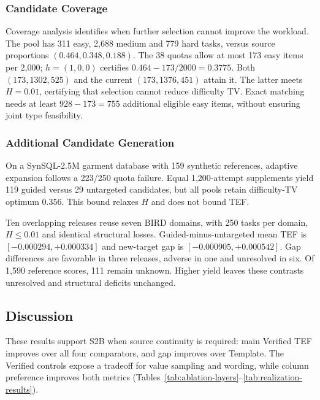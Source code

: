 \subsubsection{Candidate Coverage}\label{sec:current-support}

Coverage analysis identifies when further selection cannot improve the workload. The pool has 311 easy, 2,688 medium and 779 hard tasks, versus source proportions $(0.464,0.348,0.188)$. The 38 quotas allow at most 173 easy items per 2,000; $h=(1,0,0)$ certifies $0.464-173/2000=0.3775$. Both $(173,1302,525)$ and the current $(173,1376,451)$ attain it. The latter meets $H=0.01$, certifying that selection cannot reduce difficulty TV. Exact matching needs at least $928-173=755$ additional eligible easy items, without ensuring joint type feasibility.

\subsubsection{Additional Candidate Generation}\label{sec:acquisition}
On a SynSQL-2.5M garment database with 159 synthetic references, adaptive expansion follows a 223/250 quota failure. Equal 1,200-attempt supplements yield 119 guided versus 29 untargeted candidates, but all pools retain difficulty-TV optimum 0.356. This bound relaxes $H$ and does not bound TEF.

Ten overlapping releases reuse seven BIRD domains, with 250 tasks per domain, $H\le0.01$ and identical structural losses. Guided-minus-untargeted mean TEF is $[-0.000294,+0.000334]$ and new-target gap is $[-0.000905,+0.000542]$. Gap differences are favorable in three releases, adverse in one and unresolved in six. Of 1,590 reference scores, 111 remain unknown. Higher yield leaves these contrasts unresolved and structural deficits unchanged.






\subsection{Discussion}\label{sec:discussion}

These results support S2B when source continuity is required: main Verified TEF improves over all four comparators, and gap improves over Template. The Verified controls expose a tradeoff for value sampling and wording, while column preference improves both metrics (Tables~\ref{tab:ablation-layers}--\ref{tab:realization-results}).

